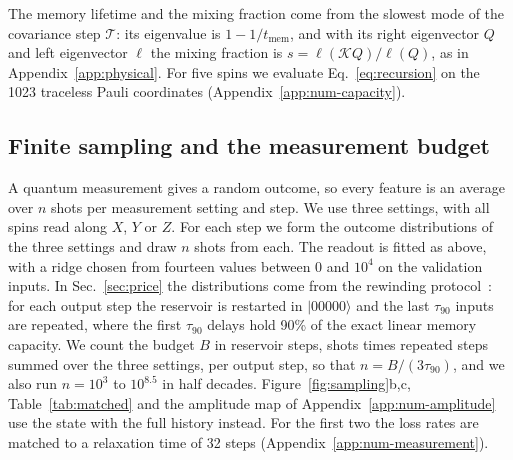 The memory lifetime and the mixing fraction come from the slowest mode of the covariance step $\mathcal T$: its
eigenvalue is $1-1/t_{\mathrm{mem}}$, and with its right eigenvector $Q$ and left eigenvector $\ell$ the mixing fraction
is $s=\ell(\mathcal KQ)/\ell(Q)$, as in Appendix~\ref{app:physical}. For five spins we evaluate
Eq.~\eqref{eq:recursion} on the 1023 traceless Pauli coordinates (Appendix~\ref{app:num-capacity}).

\subsection{Finite sampling and the measurement budget}
\label{sec:methods-sampling}
A quantum measurement gives a random outcome, so every feature is an average over $n$ shots per measurement
setting and step. We use three settings, with all spins read along $X$, $Y$ or $Z$. For each step we form the outcome
distributions of the three settings and draw $n$ shots from each. The readout is fitted as above, with a ridge
chosen from fourteen values between 0 and $10^4$ on the validation inputs. In Sec.~\ref{sec:price} the distributions
come from the rewinding protocol~\cite{Mujal2023}: for each output step the reservoir is restarted in
$|00000\rangle$ and the last $\tau_{90}$ inputs are repeated, where the first $\tau_{90}$ delays hold 90\% of the exact
linear memory capacity. We count the budget $B$ in reservoir steps, shots times repeated steps summed over the three settings, per
output step, so that $n=B/(3\tau_{90})$, and we also run $n=10^3$ to $10^{8.5}$ in half decades.
Figure~\ref{fig:sampling}b,c, Table~\ref{tab:matched} and the amplitude map of Appendix~\ref{app:num-amplitude} use
the state with the full history instead. For the first two the loss rates are matched to a relaxation time of 32
steps (Appendix~\ref{app:num-measurement}).
